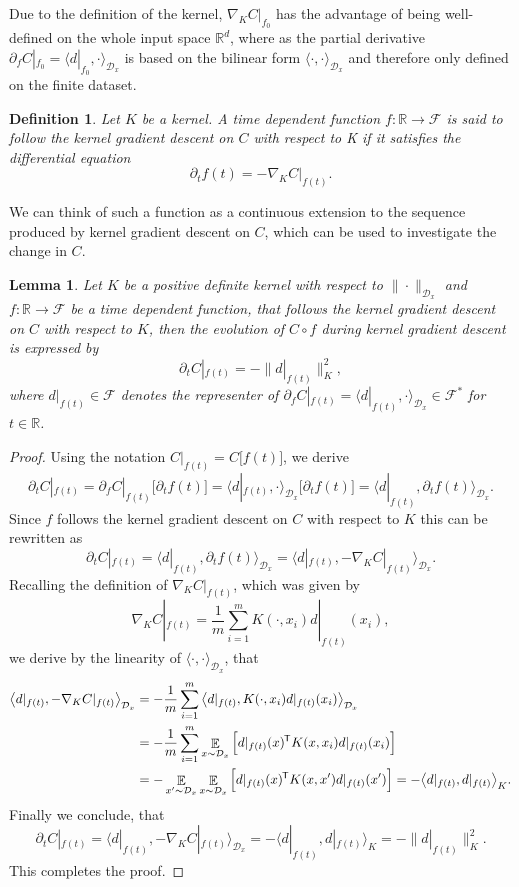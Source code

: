 \documentclass[11pt, a4paper]{article}
\newtheorem{lemma}[theorem]{Lemma}
\newtheorem{definition}[theorem]{Definition}
\newcommand{\R}{\mathbb{R}}
\newcommand{\D}{\mathcal{D}}
\newcommand{\F}{\mathcal{F}}
\newcommand*{\tr}{^{\mkern-1.5mu\mathsf{T}}}
\DeclareMathOperator*{\E}{\mathbb{E}}
\begin{document}
Due to the definition of the kernel, $\nabla_KC|_{f_0}$ has the advantage of being well-defined on the whole input space $\R^d$, where as the partial derivative $\partial_fC|_{f_0} =\langle d|_{f_0}, \cdot \rangle_{\D_x}$ is based on the bilinear form $\langle \cdot, \cdot \rangle_{\D_x}$ and therefore only defined on the finite dataset.

\begin{definition}
Let $K$ be a kernel. A time dependent function $f : \R \to \F$ is said to follow the kernel gradient descent on $C$ with respect to K if it satisfies the differential equation
\[ \partial_tf(t) = - \nabla_KC|_{f(t)}. \]
\end{definition}

We can think of such a function as a continuous extension to the sequence produced by kernel gradient descent on $C$, which can be used to investigate the change in $C$.

\begin{lemma}
Let $K$ be a positive definite kernel with respect to $\| \cdot \|_{\D_x}$ and $f: \R \to \F$ be a time dependent function, that follows the kernel gradient descent on $C$ with respect to $K$, then the evolution of $C \circ f$ during kernel gradient descent is expressed by
\[ \partial_tC|_{f(t)} = - \big \| d|_{f(t)} \big \|_{K}^2, \]
where $d|_{f(t)} \in \F$ denotes the representer of $\partial_f C|_{f(t)} = \big \langle d|_{f(t)}, \cdot \big \rangle_{\D_x} \in \F^*$ for $t \in \R$.
\end{lemma}

\begin{proof}
Using the notation $C|_{f(t)} = C \big [f(t) \big ]$, we derive
\[ \partial_tC|_{f(t)} = \partial_f C|_{f(t)} \big [ \partial_t f(t) \big ] = \big \langle d|_{f(t)}, \cdot \big \rangle_{\D_x} \big [ \partial_t f(t) \big ] = \big \langle d|_{f(t)}, \partial_t f(t) \big \rangle_{\D_x}. \]
Since $f$ follows the kernel gradient descent on $C$ with respect to $K$ this can be rewritten as
\[ \partial_tC|_{f(t)} = \big \langle d|_{f(t)}, \partial_t f(t) \big \rangle_{\D_x} = \big \langle d|_{f(t)}, - \nabla_K C|_{f(t)} \big \rangle_{\D_x}. \]
Recalling the definition of $\nabla_K C|_{f(t)}$, which was given by
\[ \nabla_KC|_{f(t)} = \frac{1}{m} \sum_{i=1}^{m} K(\cdot,x_i)d|_{f(t)}(x_i), \]
we derive by the linearity of $\langle \cdot, \cdot \rangle_{\D_x}$, that
\[ \begin{split} 
\big \langle d|_{f(t)}, - \nabla_K C|_{f(t)} \big \rangle_{\D_x} 
&= - \frac{1}{m} \sum_{i=1}^{m} \big \langle d|_{f(t)}, K(\cdot,x_i)d|_{f(t)}(x_i) \big \rangle_{\D_x} \\\
&= - \frac{1}{m} \sum_{i=1}^{m} \E_{x \sim \D_x} \Big [ d|_{f(t)}(x)\tr K(x,x_i)d|_{f(t)}(x_i) \Big ] \\\
&= - \E_{x' \sim \D_x} \E_{x \sim \D_x} \Big [ d|_{f(t)}(x)\tr K(x,x')d|_{f(t)}(x') \Big ]
= - \big \langle d|_{f(t)}, d|_{f(t)} \big \rangle_{K}.
\end{split} \]
Finally we conclude, that
\[ \partial_tC|_{f(t)} = \big \langle d|_{f(t)}, - \nabla_K C|_{f(t)} \big \rangle_{\D_x} = - \big \langle d|_{f(t)}, d|_{f(t)} \big \rangle_{K} = - \big \| d|_{f(t)} \big \|_{K}^2. \]
This completes the proof.
\end{proof}
\end{document}
